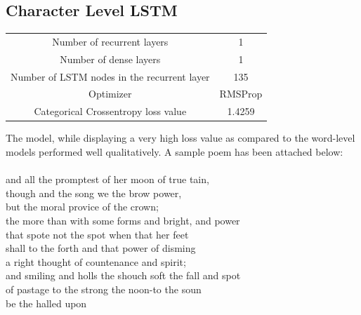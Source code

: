 \documentclass[15pt]{article}
\begin{document}
\subsection{Character Level LSTM}
\begin{center}
\begin{tabular}{c c}
Number of recurrent layers & 1 \\
Number of dense layers & 1 \\
Number of LSTM nodes in the recurrent layer  & 135 \\
Optimizer & RMSProp \\
Categorical Crossentropy loss value & 1.4259 \\
\end{tabular}
\end{center}
The model, while displaying a very high loss value as compared to the word-level models performed well qualitatively. A sample poem has been attached below:\\
\\
and all the promptest of her moon of true tain,\\
though and the song we the brow power,\\
but the moral provice of the crown;\\
the more than with some forms and bright, and power\\
that spote not the spot when that her feet\\
shall to the forth and that power of disming\\
a right thought of countenance and spirit;\\
and smiling and holls the shouch soft the fall and spot\\
of pastage to the strong the noon-to the soun\\
be the halled upon\\
\end{document}
